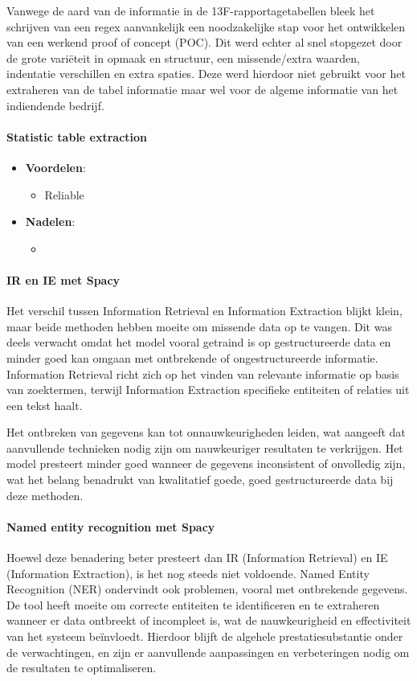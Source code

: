 Vanwege de aard van de informatie in de 13F-rapportagetabellen bleek het schrijven van een regex aanvankelijk een noodzakelijke stap voor het ontwikkelen van een werkend proof of concept (POC). Dit werd echter al snel stopgezet door de grote variëteit in opmaak en structuur, een missende/extra waarden, indentatie verschillen en extra spaties. Deze werd hierdoor niet gebruikt voor het extraheren van de tabel informatie maar wel voor de algeme informatie van het indiendende bedrijf.

\paragraph{Statistic table extraction}

\begin{itemize}
    \item \textbf{Voordelen}:
    \begin{itemize}
        \item Reliable
    \end{itemize}
    \item \textbf{Nadelen}:
    \begin{itemize}
        \item 
    \end{itemize}
\end{itemize}
\paragraph{IR en IE met Spacy}
Het verschil tussen Information Retrieval en Information Extraction blijkt klein, maar beide methoden hebben moeite om missende data op te vangen. Dit was deels verwacht omdat het model vooral getraind is op gestructureerde data en minder goed kan omgaan met ontbrekende of ongestructureerde informatie. Information Retrieval richt zich op het vinden van relevante informatie op basis van zoektermen, terwijl Information Extraction specifieke entiteiten of relaties uit een tekst haalt. 

Het ontbreken van gegevens kan tot onnauwkeurigheden leiden, wat aangeeft dat aanvullende technieken nodig zijn om nauwkeuriger resultaten te verkrijgen. Het model presteert minder goed wanneer de gegevens inconsistent of onvolledig zijn, wat het belang benadrukt van kwalitatief goede, goed gestructureerde data bij deze methoden. 
\paragraph{Named entity recognition met Spacy}
Hoewel deze benadering beter presteert dan IR (Information Retrieval) en IE (Information Extraction), is het nog steeds niet voldoende. Named Entity Recognition (NER) ondervindt ook problemen, vooral met ontbrekende gegevens. De tool heeft moeite om correcte entiteiten te identificeren en te extraheren wanneer er data ontbreekt of incompleet is, wat de nauwkeurigheid en effectiviteit van het systeem beïnvloedt. Hierdoor blijft de algehele prestatiesubstantie onder de verwachtingen, en zijn er aanvullende aanpassingen en verbeteringen nodig om de resultaten te optimaliseren.
